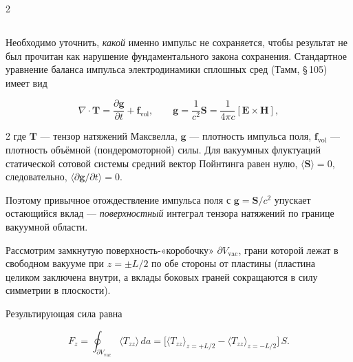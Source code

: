 \documentclass[twoside, 10pt]{article}
\def\myvspacebeforesubsection{-2.0mm}
\def\myvspaceaftersubsection{-2.5mm}
\begin{document}
\begin{multicols}{2}
\vspace{\myvspacebeforesubsection}
\subsection*{}
\vspace{\myvspaceaftersubsection}

Необходимо уточнить, \emph{какой} именно импульс не сохраняется, чтобы
результат не был прочитан как нарушение фундаментального закона сохранения.
Стандартное уравнение баланса импульса электродинамики сплошных сред
(Тамм, \S\,105) имеет вид
\end{multicols}
\[
\nabla\cdot\mathbf{T} = \frac{\partial\mathbf{g}}{\partial t} + \mathbf{f}_{\mathrm{vol}},
\qquad
\mathbf{g} = \frac{1}{c^2}\mathbf{S} = \frac{1}{4\pi c}[\mathbf{E}\times\mathbf{H}],
\]
\begin{multicols}{2}
где $\mathbf{T}$ --- тензор натяжений Максвелла, $\mathbf{g}$ --- плотность импульса
поля, $\mathbf{f}_{\mathrm{vol}}$ --- плотность объёмной (пондеромоторной) силы.
Для вакуумных флуктуаций статической сотовой системы средний вектор Пойнтинга
равен нулю, $\langle\mathbf{S}\rangle = 0$, следовательно,
$\langle\partial\mathbf{g}/\partial t\rangle = 0$.

 Поэтому привычное
отождествление импульса поля с $\mathbf{g} = \mathbf{S}/c^2$ упускает
остающийся вклад — \emph{поверхностный} интеграл тензора натяжений
по границе вакуумной области.

Рассмотрим замкнутую поверхность-«коробочку» $\partial V_{\mathrm{vac}}$, грани которой лежат
в свободном вакууме при $z = \pm L/2$ по обе стороны от пластины (пластина
целиком заключена внутри, а вклады боковых граней сокращаются в силу симметрии в плоскости).


Результирующая
сила равна
\end{multicols}
\[
F_z = \oint_{\partial V_{\mathrm{vac}}} \langle T_{zz}\rangle \, da
= \big[\langle T_{zz}\rangle_{z=+L/2} - \langle T_{zz}\rangle_{z=-L/2}\big]\,S .
\]
\end{document}
